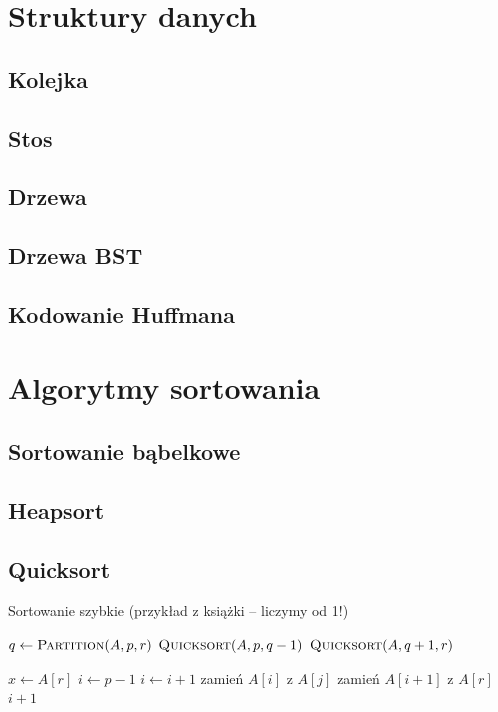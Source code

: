 \documentclass[10pt, oneside]{article}
\theoremstyle{remark}
\begin{document}
\section{Struktury danych}
\subsection{Kolejka}

\subsection{Stos}

\subsection{Drzewa}

\subsection{Drzewa BST}

\subsection{Kodowanie Huffmana}


\section{Algorytmy sortowania}

\subsection{Sortowanie bąbelkowe}

\subsection{Heapsort}

\subsection{Quicksort}
\begin{algorithm}
    \caption{Sortowanie szybkie (przykład z książki -- liczymy od 1!)}
    \label{alg:quicksort}
    \begin{algorithmic}[1] %
            		\State $q \gets \Call{Partition}{A, p, r}$
            		\State $\Call{Quicksort}{A, p, q-1}$
            		\State $\Call{Quicksort}{A, q+1, r}$
            	\EndIf
        \EndFunction
        
            	\State $x \gets A[r]$
            	\State $i \gets p - 1$
	            		\State $i \gets i +1$ 
	            		\State zamień $A[i]$ z $A[j]$
	            	\EndIf
            	\EndFor
            	\State zamień $A[i+1]$ z $A[r]$
            	\Return $i +1$
        \EndFunction
    \end{algorithmic}
\end{algorithm}
\end{document}
